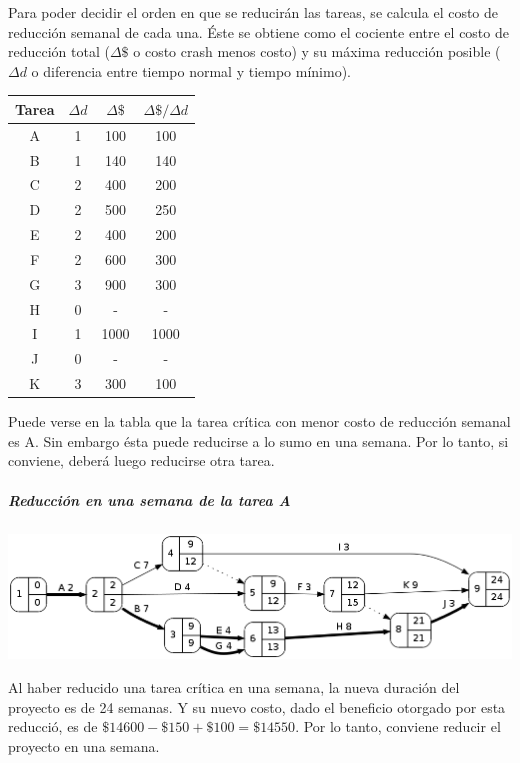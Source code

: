 \documentclass[a4paper,10pt]{article}
\begin{document}
  Para poder decidir el orden en que se reducirán las tareas, se calcula el costo de reducción semanal de cada una. Éste se obtiene como el cociente entre el costo de reducción total ($\Delta \$$ o costo crash menos costo) y su máxima reducción posible ($\Delta d$ o diferencia entre tiempo normal y tiempo mínimo).

   \begin{center}
   \begin{tabular}{|| c | c | c | c ||}
   \hline 
      Tarea & $\Delta d$ & $\Delta \$$ & $\Delta \$ / \Delta d$ \\ \hline \hline
      A & 1 & 100 & 100 \\ \hline
      B & 1 & 140 & 140 \\ \hline 
      C & 2 & 400 & 200 \\ \hline
      D & 2 & 500 & 250 \\ \hline
      E & 2 & 400 & 200 \\ \hline
      F & 2 & 600 & 300 \\ \hline
      G & 3 & 900 & 300 \\ \hline
      H & 0 &  -  & -   \\ \hline
      I & 1 &1000 & 1000\\ \hline
      J & 0 &  -  & -   \\ \hline
      K & 3 & 300 & 100 \\ \hline
   \end{tabular}
   \end{center}

   Puede verse en la tabla que la tarea crítica con menor costo de reducción semanal es A. Sin embargo ésta puede reducirse a lo sumo en una semana. Por lo tanto, si conviene, deberá luego reducirse otra tarea.

  \subparagraph {Reducción en una semana de la tarea A}
  \begin{center}
    \includegraphics[scale=0.4,keepaspectratio=true]{img/ej3-1.png} 
  \end{center}

  Al haber reducido una tarea crítica en una semana, la nueva duración del proyecto es de 24 semanas. Y su nuevo costo, dado el beneficio otorgado por esta reducció, es de $\$14600 - \$150 + \$100 = \$14550$. Por lo tanto, conviene reducir el proyecto en una semana.
\end{document}
